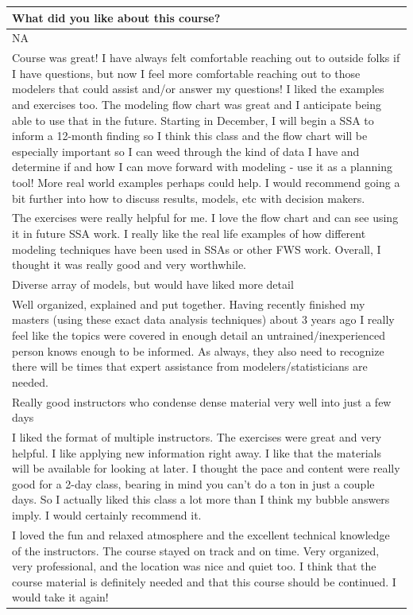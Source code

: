 \documentclass[]{article}
\begin{document}
\begin{table}[H]
\centering
\begin{tabular}{l}
\hline
What did you like about this course?\\
\hline
NA\\
\hline
Course was great! I have always felt comfortable reaching out to outside folks if I have questions, but now I feel more comfortable reaching out to those modelers that could assist and/or answer my questions! I liked the examples and exercises too. The modeling flow chart was great and I anticipate being able to use that in the future.  Starting in December, I will begin a SSA to inform a 12-month finding so I think this class and the flow chart will be especially important so I can weed through the kind of data I have and determine if and how I can move forward with modeling - use it as a planning tool!  More real world examples perhaps could help.  I would recommend going a bit further into how to discuss results, models, etc with decision makers.\\
\hline
The exercises were really helpful for me.  I love the flow chart and can see using it in future SSA work.  I really like the real life examples of how different modeling techniques have been used in SSAs or other FWS work.  Overall, I thought it was really good and very worthwhile.\\
\hline
Diverse array of models, but would have liked more detail\\
\hline
Well organized, explained and put together. Having recently finished my masters (using these exact data analysis techniques) about 3 years ago I really feel like the topics were covered in enough detail an untrained/inexperienced person knows enough to be informed. As always, they also need to recognize there will be times that expert assistance from modelers/statisticians are needed.\\
\hline
Really good instructors who condense dense material very well into just a few days\\
\hline
I liked the format of multiple instructors. The exercises were great and very helpful. I like applying new information right away. I like that the materials will be available for looking at later. I thought the pace and content were really good for a 2-day class, bearing in mind you can't do a ton in just a couple days. So I actually liked this class a lot more than I think my bubble answers imply. I would certainly recommend it.\\
\hline
I loved the fun and relaxed atmosphere and the excellent technical knowledge of the instructors.  The course stayed on track and on time.  Very organized, very professional, and the location was nice and quiet too.  I think that the course material is definitely needed and that this course should be continued.  I would take it again!\\

\end{tabular}
\end{table}
\end{document}
